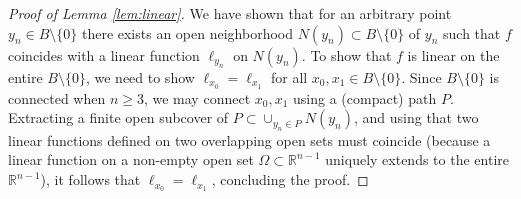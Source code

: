 \documentclass[11pt]{article}
\theoremstyle{definition}
\theoremstyle{proof}
\DeclareMathOperator{\+}{\mathop{\tilde{+}}}
\newcommand{\R}{\mathbb{R}}
\numberwithin{equation}{section}
\numberwithin{equation}{section}
\begin{document}
\begin{proof}[Proof of Lemma \ref{lem:linear}]
 We have shown that for an arbitrary point $y_n \in B \setminus \{0\}$ there exists an open neighborhood $N(y_n) \subset B \setminus \{0\}$ of $y_n$ such that $f$ coincides with a linear function $\ell_{y_n}$ on $N(y_n)$. To show that $f$ is linear on the entire $B \setminus \{0\}$, we need to show $\ell_{x_0} = \ell_{x_1}$ for all $x_0,x_1 \in B \setminus \{0\}$. Since $B \setminus \{0\}$ is connected when $n \geq 3$, we may connect $x_0,x_1$ using a (compact) path $P$. Extracting a finite open subcover of $P \subset \cup_{y_n \in P} N(y_n)$, and using that two linear functions defined on two overlapping open sets must coincide (because a linear function on a non-empty open set $\Omega \subset \R^{n-1}$ uniquely extends to the entire $\R^{n-1}$), it follows that $\ell_{x_0} = \ell_{x_1}$, concluding the proof. 
\end{proof}
\end{document}
